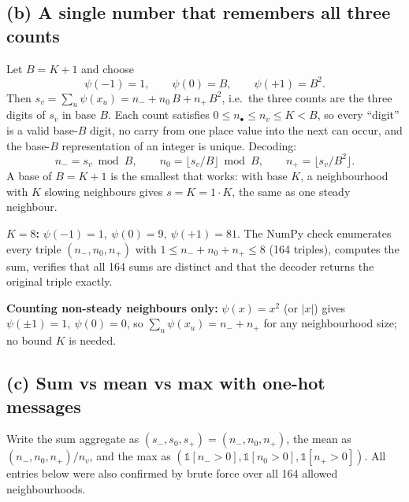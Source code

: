 \documentclass[11pt]{article}
\begin{document}
\subsection*{(b) A single number that remembers all three counts}
Let $B=K+1$ and choose
\[
\psi(-1)=1,\qquad \psi(0)=B,\qquad \psi(+1)=B^2 .
\]
Then $s_v=\sum_{u}\psi(x_u)=n_- + n_0\,B + n_+\,B^2$, i.e.\ the three counts are the three digits of
$s_v$ in base $B$. Each count satisfies $0\le n_\bullet\le n_v\le K<B$, so every ``digit'' is a valid
base-$B$ digit, no carry from one place value into the next can occur, and the base-$B$
representation of an integer is unique. Decoding:
\[
n_- = s_v \bmod B,\qquad n_0=\lfloor s_v/B\rfloor \bmod B,\qquad n_+=\lfloor s_v/B^2\rfloor .
\]
A base of $B=K+1$ is the smallest that works: with base $K$, a neighbourhood with $K$ slowing
neighbours gives $s=K=1\cdot K$, the same as one steady neighbour.

\noindent\textbf{$K=8$:} $\psi(-1)=1,\ \psi(0)=9,\ \psi(+1)=81$. The NumPy check enumerates every
triple $(n_-,n_0,n_+)$ with $1\le n_-+n_0+n_+\le 8$ (164 triples), computes the sum, verifies that all
164 sums are distinct and that the decoder returns the original triple exactly.

\noindent\textbf{Counting non-steady neighbours only:} $\psi(x)=x^2$ (or $|x|$) gives
$\psi(\pm1)=1,\ \psi(0)=0$, so $\sum_u\psi(x_u)=n_-+n_+$ for any neighbourhood size; no bound $K$ is needed.

\subsection*{(c) Sum vs mean vs max with one-hot messages}
Write the sum aggregate as $(s_-,s_0,s_+)=(n_-,n_0,n_+)$, the mean as $(n_-,n_0,n_+)/n_v$, and the
max as $(\mathbb 1[n_->0],\mathbb 1[n_0>0],\mathbb 1[n_+>0])$.
All entries below were also confirmed by brute force over all 164 allowed neighbourhoods.
\end{document}
